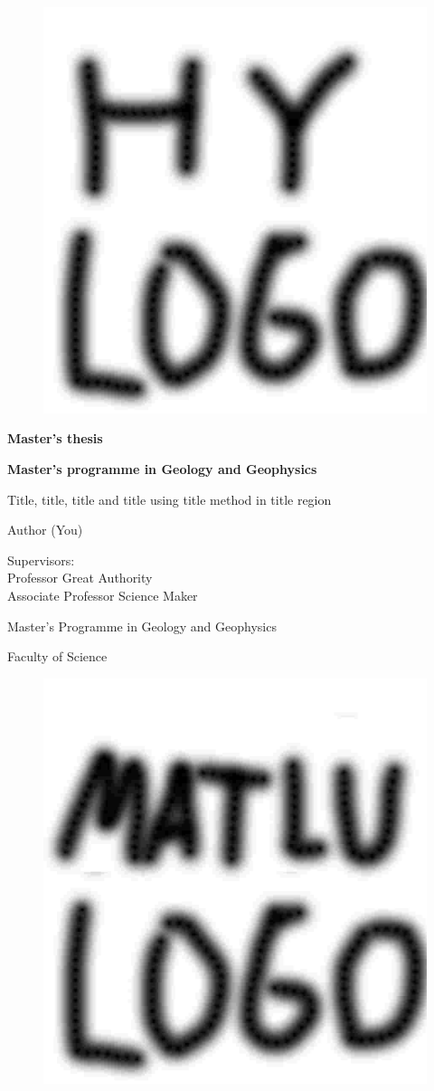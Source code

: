 \documentclass[12pt]{article}%
\begin{document}
\begin{titlepage}
\begin{center}
\begin{figure}[h]
\centering
\vspace{1cm}
\includegraphics[width=0.25\linewidth]{hy.jpg}
\end{figure}
\vspace*{3cm}
\textbf{Master's thesis}\\
\bigskip

\textbf{Master's programme in Geology and Geophysics}\\
\vspace*{1cm}

Title, title, title and title using title method in title region

Author (You)

\the\year
\vspace*{2cm}

Supervisors:\\
Professor Great Authority\\
Associate Professor Science Maker\\
\vspace*{2cm}

Master’s Programme in Geology and Geophysics 

Faculty of Science
\end{center}
\end{titlepage}


\begin{figure}[h]
\vspace{-2cm}
\hspace{-3cm}
\includegraphics[width=0.4\linewidth]{matlu_logo}
\end{figure}
\end{document}
